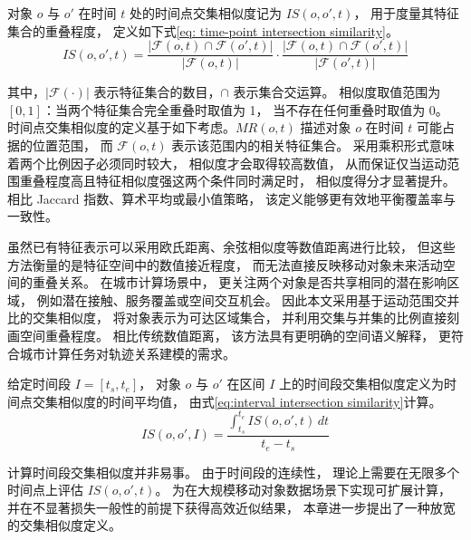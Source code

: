     \begin{definition}[时间点交集相似度]
    对象 $o$ 与 $o'$ 在时间 $t$ 处的时间点交集相似度记为 $IS(o,o',t)$， 用于度量其特征集合的重叠程度， 定义如下式\eqref{eq: time-point intersection similarity}。
    \begin{equation}
    \label{eq: time-point intersection similarity}
    IS(o,o',t) =
    \frac{|\mathcal{F}(o,t) \cap \mathcal{F}(o',t)|}{|\mathcal{F}(o,t)|}
    \cdot
    \frac{|\mathcal{F}(o,t) \cap \mathcal{F}(o',t)|}{|\mathcal{F}(o',t)|}
    \end{equation}


    \end{definition}
    其中，$|\mathcal{F}(\cdot)|$ 表示特征集合的数目，$\cap$ 表示集合交运算。 相似度取值范围为 $[0,1]$：当两个特征集合完全重叠时取值为 1， 当不存在任何重叠时取值为 0。
    时间点交集相似度的定义基于如下考虑。$MR(o,t)$ 描述对象 $o$ 在时间 $t$ 可能占据的位置范围， 而 $\mathcal{F}(o,t)$ 表示该范围内的相关特征集合。 采用乘积形式意味着两个比例因子必须同时较大， 相似度才会取得较高数值， 从而保证仅当运动范围重叠程度高且特征相似度强这两个条件同时满足时， 相似度得分才显著提升。 相比 Jaccard 指数、算术平均或最小值策略， 该定义能够更有效地平衡覆盖率与一致性。

    虽然已有特征表示可以采用欧氏距离、余弦相似度等数值距离进行比较， 但这些方法衡量的是特征空间中的数值接近程度， 而无法直接反映移动对象未来活动空间的重叠关系。 在城市计算场景中， 更关注两个对象是否共享相同的潜在影响区域， 例如潜在接触、服务覆盖或空间交互机会。 因此本文采用基于运动范围交并比的交集相似度， 将对象表示为可达区域集合， 并利用交集与并集的比例直接刻画空间重叠程度。 相比传统数值距离， 该方法具有更明确的空间语义解释， 更符合城市计算任务对轨迹关系建模的需求。

    \begin{definition}[时间段交集相似度]\label{defi:interval similarity}
    给定时间段 $I = [t_s,t_e]$， 对象 $o$ 与 $o'$ 在区间 $I$ 上的时间段交集相似度定义为时间点交集相似度的时间平均值， 由式\eqref{eq:interval intersection similarity}计算。
    \begin{equation}
    \label{eq:interval intersection similarity}
    IS(o,o',I) =
    \frac{\int_{t_s}^{t_e} IS(o,o',t)\, dt}{t_e - t_s}
    \end{equation}
    \end{definition}

    计算时间段交集相似度并非易事。 由于时间段的连续性， 理论上需要在无限多个时间点上评估 $IS(o,o',t)$。 为在大规模移动对象数据场景下实现可扩展计算， 并在不显著损失一般性的前提下获得高效近似结果， 本章进一步提出了一种放宽的交集相似度定义。


